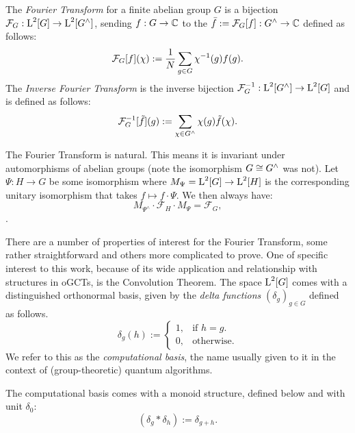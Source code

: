\begin{defn}
The \emph{Fourier Transform} for a finite abelian group $G$ is a bijection $\mathcal{F}_G:\operatorname{L}^2[G]\rightarrow\operatorname{L}^2[G^\wedge]$, sending $f:G\to\mathbb{C}$ to the $\bar{f}:=\mathcal{F}_G[f]:G^\wedge\to\mathbb{C}$ defined as follows:
\begin{equation}\label{eqn_DefTraditionalFT}
  \mathcal{F}_G[f](\chi) := \frac{1}{N}\sum_{g \in G}\chi^{-1}(g)f(g).
\end{equation}
The \emph{Inverse Fourier Transform} is the inverse bijection $\mathcal{F}_G^{-1}: \operatorname{L}^2[G^\wedge] \rightarrow \operatorname{L}^2[G]$ and is defined as follows:
\begin{equation}\label{eqn_DefTraditionalInverseFT}
  \mathcal{F}_G^{-1}[\tilde{f}](g) := \sum_{\chi \in G^\wedge}\chi(g)\tilde{f}(\chi).
\end{equation}
\end{defn}

The Fourier Transform is natural.  This means it is invariant under automorphisms of abelian groups (note the isomorphism $G \cong G^\wedge$ was not). Let $\Psi : H \rightarrow G$ be some isomorphism where $M_\Psi = \operatorname{L}^2[G] \rightarrow \operatorname{L}^2[H]$ is the corresponding unitary isomorphism that takes $f\mapsto f\cdot \Psi$. We then always have:
\begin{equation}\label{eqn_FTcanonicity}
  M_{\Psi^\wedge} \cdot \mathcal{F}_H \cdot M_\Psi =  \mathcal{F}_G,
\end{equation}
.

There are a number of properties of interest for the Fourier Transform, some rather straightforward and others more complicated to prove. One of specific interest to this work, because of its wide application and relationship with structures in oGCTs, is the Convolution Theorem. The space $\operatorname{L}^2[G]$ comes with a distinguished orthonormal basis, given by the \emph{delta functions} $(\delta_g)_{g\in G}$ defined as follows.
\begin{equation}
\label{eqn_computationalBasis}
  \delta_g(h):=\begin{cases}
    1, & \text{if $h=g$}.\\
    0, & \text{otherwise}.
  \end{cases}
\end{equation}
We refer to this as the \emph{computational basis}, the name usually given to it in the context of (group-theoretic) quantum algorithms.

The computational basis comes with a monoid structure, defined below and with unit $\delta_0$:
\begin{equation}
  \left(\delta_g*\delta_h\right):=\delta_{g+h}.
\end{equation}

